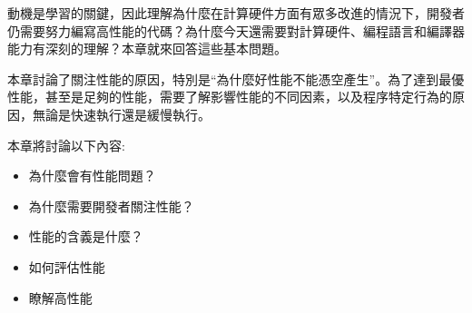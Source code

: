 動機是學習的關鍵，因此理解為什麼在計算硬件方面有眾多改進的情況下，開發者仍需要努力編寫高性能的代碼？為什麼今天還需要對計算硬件、編程語言和編譯器能力有深刻的理解？本章就來回答這些基本問題。

本章討論了關注性能的原因，特別是“為什麼好性能不能憑空產生”。為了達到最優性能，甚至是足夠的性能，需要了解影響性能的不同因素，以及程序特定行為的原因，無論是快速執行還是緩慢執行。

本章將討論以下內容:

\begin{itemize}
\item 為什麼會有性能問題？
\item 為什麼需要開發者關注性能？
\item 性能的含義是什麼？
\item 如何評估性能
\item 瞭解高性能
\end{itemize}














